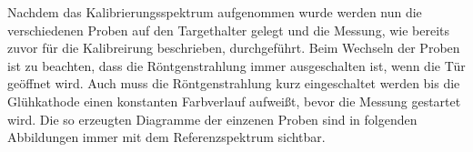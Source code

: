 \documentclass[12pt,english,ngerman]{scrartcl}
\begin{document}
Nachdem das Kalibrierungsspektrum aufgenommen wurde werden nun die verschiedenen Proben auf den Targethalter gelegt 
und die Messung, wie bereits zuvor für die Kalibreirung beschrieben, durchgeführt. Beim Wechseln der Proben ist zu beachten, 
dass die Röntgenstrahlung immer ausgeschalten ist, wenn die Tür geöffnet wird. Auch muss die Röntgenstrahlung kurz 
eingeschaltet werden bis die Glühkathode einen konstanten Farbverlauf aufweißt, bevor die Messung gestartet wird.
Die so erzeugten Diagramme der einzenen Proben sind in folgenden Abbildungen immer mit dem Referenzspektrum sichtbar.

\begin{figure}[H]
	\centering
	 \hfill
\end{figure}
\end{document}
